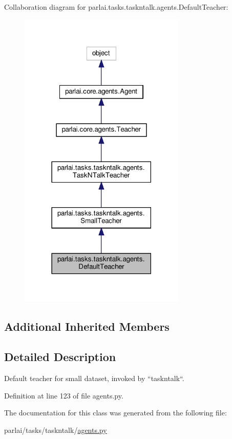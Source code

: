 Collaboration diagram for parlai.\+tasks.\+taskntalk.\+agents.\+Default\+Teacher\+:\nopagebreak
\begin{figure}[H]
\begin{center}
\leavevmode
\includegraphics[width=225pt]{d3/d80/classparlai_1_1tasks_1_1taskntalk_1_1agents_1_1DefaultTeacher__coll__graph}
\end{center}
\end{figure}
\subsection*{Additional Inherited Members}


\subsection{Detailed Description}
\begin{DoxyVerb}Default teacher for small dataset, invoked by ``taskntalk``.
\end{DoxyVerb}
 

Definition at line 123 of file agents.\+py.



The documentation for this class was generated from the following file\+:\begin{DoxyCompactItemize}
\item 
parlai/tasks/taskntalk/\hyperlink{parlai_2tasks_2taskntalk_2agents_8py}{agents.\+py}\end{DoxyCompactItemize}
